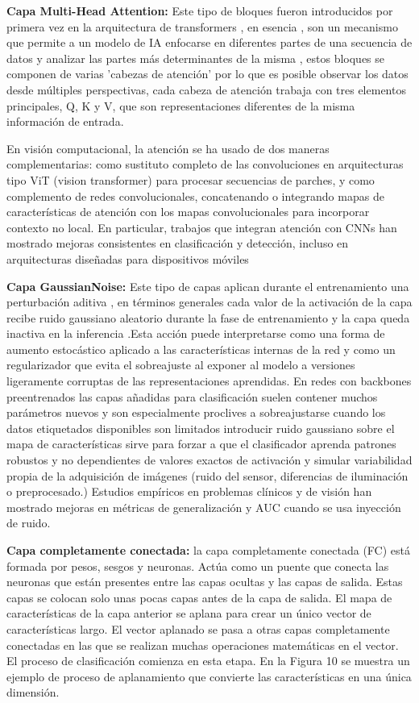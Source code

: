 \textbf{Capa Multi-Head Attention:} Este tipo de bloques fueron introducidos por primera
vez en la arquitectura de transformers , en esencia , son
un mecanismo que permite a un modelo de IA enfocarse en diferentes partes de una secuencia
de datos y analizar las partes más determinantes de la misma , estos bloques se componen
de varias 'cabezas de atención' por lo que es posible observar los datos desde múltiples
perspectivas, cada cabeza de atención trabaja con tres elementos principales, Q, K y V,
que son representaciones diferentes de la misma información de entrada.

En visión computacional, la atención se ha usado de dos maneras complementarias: como
sustituto completo de las convoluciones en arquitecturas tipo ViT (vision transformer)
para procesar secuencias de parches, y como complemento de redes convolucionales,
concatenando o integrando mapas de características de atención con los mapas
convolucionales para incorporar contexto no local. En particular, trabajos que integran
atención con CNNs han mostrado mejoras consistentes en clasificación y detección, incluso
en arquitecturas diseñadas para dispositivos móviles 

\textbf{Capa GaussianNoise:} Este tipo de capas aplican durante el entrenamiento una
perturbación aditiva , en términos generales cada valor de la activación de la capa recibe
ruido gaussiano aleatorio durante la fase de entrenamiento y la capa queda inactiva en la
inferencia .Esta acción puede interpretarse como una forma de aumento estocástico aplicado
a las características internas de la red y como un regularizador que evita el sobreajuste
al exponer al modelo a versiones ligeramente corruptas de las representaciones aprendidas.
En redes con backbones preentrenados las capas añadidas para clasificación suelen contener
muchos parámetros nuevos y son especialmente proclives a sobreajustarse cuando los datos
etiquetados disponibles son limitados introducir ruido gaussiano sobre el mapa de
características sirve para forzar a que el clasificador aprenda patrones robustos y no
dependientes de valores exactos de activación y simular variabilidad propia de la
adquisición de imágenes (ruido del sensor, diferencias de iluminación o preprocesado.)
Estudios empíricos en problemas clínicos y de visión han mostrado mejoras en métricas de
generalización y AUC cuando se usa inyección de ruido. 


\textbf{Capa completamente conectada:} la capa completamente conectada (FC) está formada
por pesos, sesgos y neuronas. Actúa como un puente que conecta las neuronas que están
presentes entre las capas ocultas y las capas de salida. Estas capas se colocan solo unas
pocas capas antes de la capa de salida. El mapa de características de la capa anterior se
aplana para crear un único vector de características largo. El vector aplanado se pasa a
otras capas completamente conectadas en las que se realizan muchas operaciones matemáticas
en el vector. El proceso de clasificación comienza en esta etapa. En la Figura 10 se
muestra un ejemplo de proceso de aplanamiento que convierte las características en una
única dimensión.

